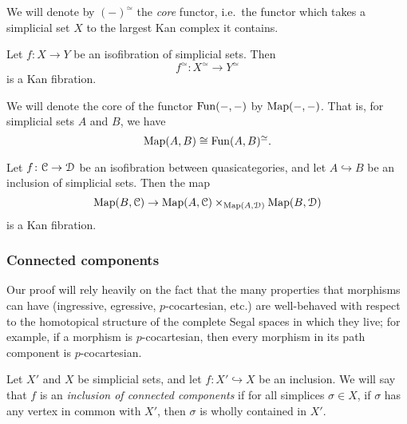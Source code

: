 \documentclass[main.tex]{subfiles}
\begin{document}
We will denote by $(-)^{\simeq}$ the \emph{core} functor, i.e.\ the functor which takes a simplicial set $X$ to the largest Kan complex it contains.
\begin{proposition}
  Let $f\colon X \to Y$ be an isofibration of simplicial sets. Then
  \begin{equation*}
    f^{\simeq}\colon X^{\simeq} \to Y^{\simeq}
  \end{equation*}
  is a Kan fibration.
\end{proposition}

We will denote the core of the functor $\mathrm{Fun}(-, -)$ by $\mathrm{Map}(-, -)$. That is, for simplicial sets $A$ and $B$, we have
\begin{equation*}
  \mathrm{Map}(A, B) \cong \mathrm{Fun}(A, B)^{\simeq}.
\end{equation*}

\begin{corollary}
  \label{cor:kan_fib_and_isofib}
  Let $f\colon \mathcal{C} \to \mathcal{D}$ be an isofibration between quasicategories, and let $A \hookrightarrow B$ be an inclusion of simplicial sets. Then the map
  \begin{equation*}
    \mathrm{Map}(B, \mathcal{C}) \to \mathrm{Map}(A, \mathcal{C}) \times_{\mathrm{Map}(A, \mathcal{D})} \mathrm{Map}(B, \mathcal{D})
  \end{equation*}
  is a Kan fibration.
\end{corollary}

\subsubsection{Connected components}

Our proof will rely heavily on the fact that the many properties that morphisms can have (ingressive, egressive, $p$-cocartesian, etc.) are well-behaved with respect to the homotopical structure of the complete Segal spaces in which they live; for example, if a morphism is $p$-cocartesian, then every morphism in its path component is $p$-cocartesian.

Let $X'$ and $X$ be simplicial sets, and let $f\colon X' \hookrightarrow X$ be an inclusion. We will say that $f$ is an \emph{inclusion of connected components} if for all simplices $\sigma \in X$, if $\sigma$ has any vertex in common with $X'$, then $\sigma$ is wholly contained in $X'$.
\end{document}
